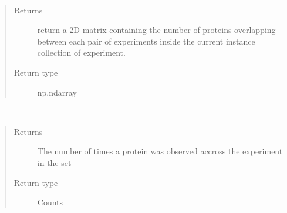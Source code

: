 \documentclass[letterpaper,10pt,english]{sphinxmanual}
\begin{document}
\begin{fulllineitems}
\begin{fulllineitems}
\begin{quote}
\begin{description}
\end{description}\end{quote}

\end{fulllineitems}


\begin{fulllineitems}
\label{\detokenize{IPTK.Classes:IPTK.Classes.ExperimentalSet.ExperimentSet.compute_protein_overlap_matrix}}~\begin{quote}\begin{description}
\item[{Returns}] \leavevmode
return a 2D matrix containing the number of proteins overlapping between each pair of experiments inside the current instance collection of experiment.

\item[{Return type}] \leavevmode
np.ndarray

\end{description}\end{quote}

\end{fulllineitems}


\begin{fulllineitems}
\label{\detokenize{IPTK.Classes:IPTK.Classes.ExperimentalSet.ExperimentSet.compute_protein_representation_count}}~\begin{quote}\begin{description}
\item[{Returns}] \leavevmode
The number of times a protein was observed accross the experiment in the set

\item[{Return type}] \leavevmode
Counts

\end{description}\end{quote}


\end{fulllineitems}
\end{fulllineitems}
\end{document}
